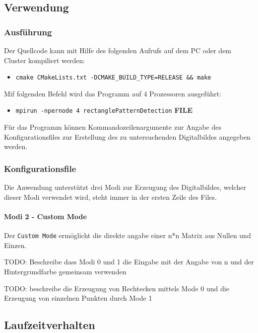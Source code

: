 \subsection{Verwendung}
\subsubsection{Ausführung}
Der Quellcode kann mit Hilfe des folgenden Aufrufs auf dem PC oder dem Cluster kompiliert werden:

\begin{itemize}
	\item \texttt{cmake CMakeLists.txt -DCMAKE\_BUILD\_TYPE=RELEASE \&\& make}
\end{itemize}

Mif folgenden Befehl wird das Programm auf 4 Prozessoren ausgeführt:

\begin{itemize}
	\item \texttt{mpirun -npernode 4 rectanglePatternDetection} \textbf{FILE}
\end{itemize}

Für das Programm können Kommandozeilenargumente zur Angabe des Konfigurationsfiles zur Erstellung des zu untersuchenden Digitalbildes angegeben werden.

\subsubsection{Konfigurationsfile}
Die Anwendung unterstützt drei Modi zur Erzeugung des Digitalbildes, welcher dieser Modi verwendet wird, steht immer in der ersten Zeile des Files.

\paragraph{Modi 2 - Custom Mode}Der \texttt{Custom Mode} ermöglicht die direkte angabe einer n*n Matrix aus Nullen und Einzen.

TODO: Beschreibe dass Modi 0 und 1 die Eingabe mit der Angabe von n und der Hintergrundfarbe gemeinsam verwenden 

TODO: beschreibe die Erzeugung von Rechtecken mittels Mode 0 und die Erzeugung von einzelnen Punkten durch Mode 1

\subsection{Laufzeitverhalten}

